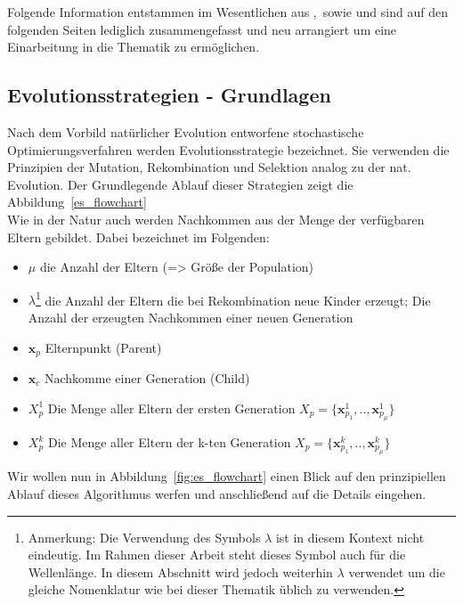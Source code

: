 \label{seq:EvolutionaryStrategies}
Folgende Information entstammen im Wesentlichen aus \cite{kost2003optimierung},\cite{bronstejn2012taschenbuch}\ sowie \cite{Hansen:1} und sind auf den folgenden Seiten lediglich zusammengefasst und neu arrangiert um eine Einarbeitung in die Thematik zu ermöglichen.\\
\subsection{Evolutionsstrategien - Grundlagen }
%
Nach dem Vorbild natürlicher Evolution entworfene stochastische Optimierungsverfahren werden Evolutionsstrategie bezeichnet. Sie verwenden die Prinzipien der Mutation, Rekombination und Selektion analog zu der nat. Evolution. Der Grundlegende Ablauf dieser Strategien zeigt die Abbildung~\ref{es_flowchart}\\
Wie in der Natur auch werden Nachkommen aus der Menge der verfügbaren Eltern gebildet. Dabei bezeichnet im Folgenden:
\begin{itemize}
\item $\mu$ die Anzahl der Eltern (=> Größe der Population)
\item $\lambda$\footnote{Anmerkung: Die Verwendung des Symbols $\lambda$ ist in diesem Kontext nicht eindeutig. Im Rahmen dieser Arbeit steht dieses Symbol auch für die Wellenlänge. In diesem Abschnitt wird jedoch weiterhin $\lambda$ verwendet um die gleiche Nomenklatur wie bei dieser Thematik üblich zu verwenden.} die Anzahl der Eltern die bei Rekombination neue Kinder erzeugt; Die Anzahl der erzeugten Nachkommen einer neuen Generation
\item $\mathbf{x}_p$ Elternpunkt (Parent)
\item $\mathbf{x}_c$ Nachkomme einer Generation (Child)
\item $X_p^1$ Die Menge aller Eltern der ersten Generation $X_p = \{\mathbf{x}_{p_1}^1,..,\mathbf{x}_{p_\mu}^1\}$
\item $X_p^k$ Die Menge aller Eltern der k-ten Generation $X_p = \{\mathbf{x}_{p_1}^k,..,\mathbf{x}_{p_\mu}^k\}$
\end{itemize}
%
Wir wollen nun in Abbildung~\ref{fig:es_flowchart} einen Blick auf den prinzipiellen Ablauf dieses Algorithmus werfen und anschließend auf die Details eingehen.
%

